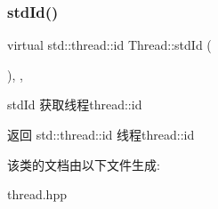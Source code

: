 \subsubsection{\texorpdfstring{std\+Id()}{stdId()}}
{\footnotesize\ttfamily virtual std\+::thread\+::id Thread\+::std\+Id (\begin{DoxyParamCaption}{ }\end{DoxyParamCaption})\hspace{0.3cm}{\ttfamily [inline]}, {\ttfamily [final]}, {\ttfamily [virtual]}}



std\+Id 获取线程thread\+::id 

\begin{DoxyReturn}{返回}
std\+::thread\+::id 线程thread\+::id 
\end{DoxyReturn}


该类的文档由以下文件生成\+:\begin{DoxyCompactItemize}
\item 
thread.\+hpp\end{DoxyCompactItemize}
